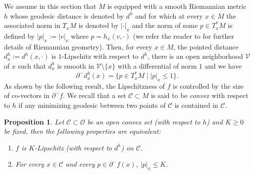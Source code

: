 \documentclass[JEP,XML,SOM,Unicode,NoFloatCountersInSection,published]{cedram}
\newenvironment{enumeratei}
{\bgroup\def\theenumi{\roman{enumi}}\def\theenumii{\arabic{enumii}}\begin{enumerate}}
{\end{enumerate}\egroup}
\let\sep\mid
\newtheorem{proposition}[theorem]{Proposition}
\theoremstyle{definition}
\begin{document}
We assume in this section that $M$ is equipped with a smooth Riemannian metric $h$ whose geodesic distance is denoted by $d^h$ and for which at every $x\in M$ the associated norm in $T_xM$ is denoted by $|\cdot|_x$ and the norm of some $p\in T_x^*M$ is defined by $|p|_x:=|v|_x$ where $p=h_x(v,\cdot)$ (we refer the reader to \cite{sakai96} for further details of Riemannian geometry). Then, for every $x\in M$, the pointed distance $d^h_x:=d^h(x,\cdot)$ is $1$-Lipschitz with respect to $d^h$, there is an open neighborhood $\mathcal{V}$ of $x$ such that $d^h_x$ is smooth in $\mathcal{V} \setminus \{x\}$ with a differential of norm $1$ and we have
\begin{equation}\label{22avril1}
\partial^-d_x^h(x) =\bigl\{ p\in T_x^*M \sep  |p|_x\leq 1\bigr\}.
\end{equation}
As shown by the following result, the Lipschitzness of $f$ is controlled by the size of co-vectors in $\partial^- f$. We recall that a set $\mathcal{C}\subset M$ is said to be {\it convex} with respect to $h$ if any minimizing geodesic between two points of $\mathcal{C}$ is contained in $\mathcal{C}$.

\begin{proposition}\label{PROPSubLip}
Let $\mathcal{C} \subset \mathcal{O}$ be an open convex set (with respect to $h$) and $K\geq 0$ be fixed, then the following properties are equivalent:
\begin{enumeratei}
\item\label{PROPSubLipi}
$f$ is $K$-Lipschitz (with respect to $d^h$) on $\mathcal{C}$.
\item\label{PROPSubLipii}
For every $x\in \mathcal{C}$ and every $p\in \partial^-f(x)$, $|p|_x\leq K$.
\end{enumeratei}
\end{proposition}
\end{document}
